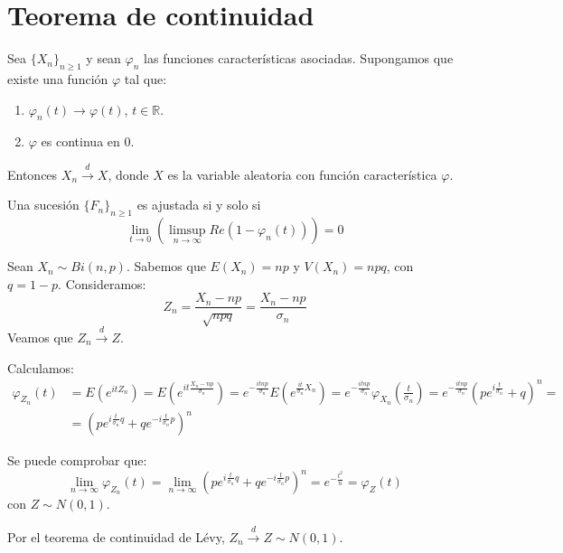 \section{Teorema de continuidad}
\begin{theorem}
    Sea $\{X_n\}_{n \geq 1}$ y sean $\varphi_n$ las funciones características asociadas.
    Supongamos que existe una función $\varphi$ tal que:
    \begin{enumerate}
        \item $\varphi_n(t) \to \varphi(t)$, $t \in \mathbb{R}$.
        \item $\varphi$ es continua en 0.
    \end{enumerate}
    Entonces $X_n \xrightarrow{d} X$, donde $X$ es la variable aleatoria con función característica $\varphi$.
\end{theorem}

\begin{theorem}
    Una sucesión $\{F_n\}_{n \geq 1}$ es ajustada si y solo si $$\lim\limits_{t \to 0} \left( \limsup\limits_{n \to \infty} Re(1 - \varphi_n(t))\right) = 0$$
\end{theorem}

\begin{remark}
    Sean $X_n \sim Bi(n, p)$.
    Sabemos que $E(X_n) = np$ y $V(X_n) = npq$, con $q = 1-p$.
    Consideramos:
    $$Z_n = \frac{X_n - np}{\sqrt{npq}} = \frac{X_n - np}{\sigma_n}$$
    Veamos que $Z_n \xrightarrow{d} Z$.

    Calculamos:
    \begin{align*}
        \varphi_{Z_n}(t) & = E(e^{itZ_n}) = E(e^{it\frac{X_n-np}{\sigma_n}}) = e^{-\frac{itnp}{\sigma_n}} E(e^{\frac{it}{\sigma_n}X_n}) = e^{-\frac{itnp}{\sigma_n}} \varphi_{X_n} \left(\frac{t}{\sigma_n}\right) = e^{-\frac{itnp}{\sigma_n}} (pe^{i\frac{t}{\sigma_n}} + q)^n = \\
                         & = (pe^{i\frac{t}{\sigma_n}q} + qe^{-i\frac{t}{\sigma_n}p})^n
    \end{align*}

    Se puede comprobar que:
    $$\lim\limits_{n \to \infty} \varphi_{Z_n}(t) = \lim\limits_{n \to \infty} (pe^{i\frac{t}{\sigma_n}q} + qe^{-i\frac{t}{\sigma_n}p})^n = e^{-\frac{t^2}{n}} = \varphi_Z(t)$$
    con $Z \sim N(0, 1)$.

    Por el teorema de continuidad de Lévy, $Z_n \xrightarrow{d} Z \sim N(0, 1)$.
\end{remark}

